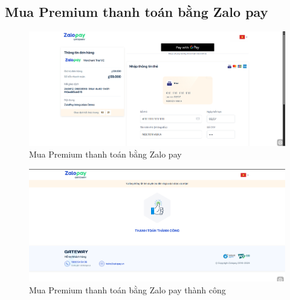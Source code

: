 \subsection{Mua Premium thanh toán bằng Zalo pay}
\begin{figure}[H]
    \centering
    \includegraphics[width=1\textwidth]{imgs/chap5/premium_4.png}
    \caption{Mua Premium thanh toán bằng Zalo pay}
\end{figure}
\begin{figure}[H]
    \centering
    \includegraphics[width=1\textwidth]{imgs/chap5/premium_4_1.png}
    \caption{Mua Premium thanh toán bằng Zalo pay thành công}
\end{figure}